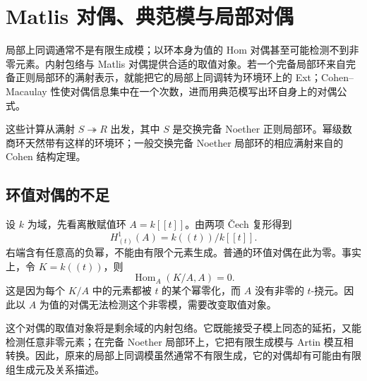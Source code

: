 
\section{Matlis 对偶、典范模与局部对偶}
\label{b3:sec:2202}

局部上同调通常不是有限生成模；以环本身为值的 Hom 对偶甚至可能检测不到非零元素。内射包络与 Matlis 对偶提供合适的取值对象。若一个完备局部环来自完备正则局部环的满射表示，就能把它的局部上同调转为环境环上的 Ext；Cohen–Macaulay 性使对偶信息集中在一个次数，进而用典范模写出环自身上的对偶公式。

\ProseParagraphBreak
这些计算从满射 \(S\twoheadrightarrow R\) 出发，其中 \(S\) 是交换完备 Noether 正则局部环。幂级数商环天然带有这样的环境环；一般交换完备 Noether 局部环的相应满射来自的 Cohen 结构定理。

%
%
%

\subsection{环值对偶的不足}
\label{b3:subsec:2202:01}

设 \(k\) 为域，先看离散赋值环 \(A=k[\![t]\!]\)。由两项 Čech 复形得到
\[
	H^1_{(t)}(A)=k(\!(t)\!)/k[\![t]\!].
\]
右端含有任意高的负幂，不能由有限个元素生成。普通的环值对偶在此为零。事实上，令 \(K=k(\!(t)\!)\)，则
\[
	\operatorname{Hom}_A(K/A,A)=0.
\]
这是因为每个 \(K/A\) 中的元素都被 \(t\) 的某个幂零化，而 \(A\) 没有非零的 \(t\)-挠元。因此以 \(A\) 为值的对偶无法检测这个非零模，需要改变取值对象。

\ProseParagraphBreak
这个对偶的取值对象将是剩余域的内射包络。它既能接受子模上同态的延拓，又能检测任意非零元素；在完备 Noether 局部环上，它把有限生成模与 Artin 模互相转换。因此，原来的局部上同调模虽然通常不有限生成，它的对偶却有可能由有限组生成元及关系描述。

